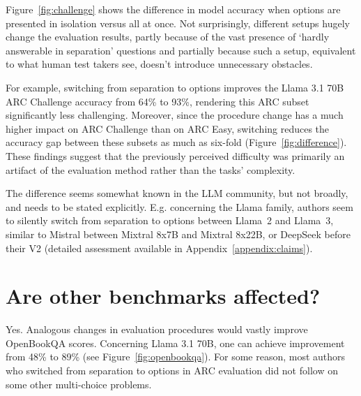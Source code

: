 \documentclass[11pt]{article}
\DeclareRobustCommand{\shl}[3]{
  \begingroup\setlength{\fboxsep}{2pt}%
  \colorbox{#1}{{\hspace*{2pt}\vphantom{Ay}#2\hspace*{2pt}}}%
  \endgroup
}
\begin{document}
Figure~\ref{fig:challenge} shows the difference in model accuracy when options are presented in isolation versus all at once.
Not surprisingly, different setups hugely change the evaluation results, partly because of the vast presence of `hardly answerable in separation' questions and partially because such a setup, equivalent to what human test takers see, doesn't introduce unnecessary obstacles.

For example, switching from \shl{separation}{separation}{} to \shl{all}{options}{} improves the Llama 3.1 70B ARC Challenge accuracy from 64\% to 93\%, rendering this ARC subset significantly less challenging.
Moreover, since the procedure change has a much higher impact on ARC Challenge than on ARC Easy, switching reduces the accuracy gap between these subsets as much as six-fold (Figure~\ref{fig:difference}). 
These findings suggest that the previously perceived difficulty was primarily an artifact of the evaluation method rather than the tasks' complexity.

The difference seems somewhat known in the LLM community, but not broadly, and needs to be stated explicitly. E.g. concerning the Llama family, authors seem to silently switch from \shl{separation}{separation}{} to \shl{all}{options}{} between Llama~2 and Llama~3, similar to Mistral between Mixtral 8x7B and Mixtral 8x22B, or DeepSeek before their V2 (detailed assessment available in Appendix~\ref{appendix:claims}).

\section{Are other benchmarks affected?}

Yes. Analogous changes in evaluation procedures would vastly improve OpenBookQA scores. Concerning Llama 3.1 70B, one can achieve improvement from 48\% to 89\% (see Figure~\ref{fig:openbookqa}). For some reason, most authors who switched from \shl{separation}{separation}{} to \shl{all}{options}{} in ARC evaluation did not follow on some other multi-choice problems. %
\end{document}
